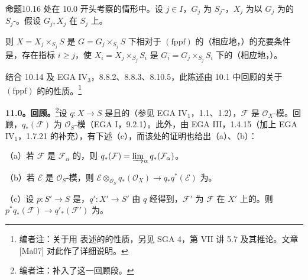 \begin{SGAresult}{命题}{10.16}
处在 10.0 开头考察的情形中。设 $j\in I$，$G_j$ 为 $S_j$-，$X_j$ 为以 $G_j$ 为的 $S_j$-。假设 $G_j,X_j$ 在 $S_j$ 上。

则 $X=X_j\times_{S_j}S$ 是 $G=G_j\times_{S_j}S$ 下相对于 $(\mathrm{fppf})$ 的（相应地，）的充要条件是，存在指标 $i\geq j$，使 $X_i=X_j\times_{S_j}S_i$ 是 $G_i=G_j\times_{S_j}S_i$ 下的（相应地，）。
\end{SGAresult}
结合 10.14 及 EGA IV$_3$，8.8.2、8.8.3、8.10.5，此陈述由 10.1 中回顾的关于 $(\mathrm{fppf})$ 的的性质。\footnote{编者注：关于用 表述的的性质，另见 SGA 4，第 VII 讲 5.7 及其推论。文章 [Ma07] 对此作了详细说明。}

\textbf{11.0。回顾。}\footnote{编者注：补入了这一回顾段。}设 $q:X\to S$ 是且的（参见 EGA IV$_1$，1.1、1.2），$\mathcal F$ 是 $\mathcal O_X$-模。回顾，$q_*(\mathcal F)$ 为 $\mathcal O_S$-模（EGA I，9.2.1）。此外，由 EGA III，1.4.15（加上 EGA IV$_1$，1.7.21 的补充），有下述（c），而该处的证明也给出（a）、（b）：

（a）若 $\mathcal F$ 是 $\mathcal F_\alpha$ 的，则 $q_*(\mathcal F)=\varinjlim_\alpha q_*(\mathcal F_\alpha)$。

（b）若 $\mathcal E$ 是 $\mathcal O_S$-模，则 $\mathcal E\otimes_{\mathcal O_S}q_*(\mathcal O_X)\to q_*q^*(\mathcal E)$ 为。

（c）设 $p:S'\to S$ 是，$q':X'\to S'$ 由 $q$ 经得到，$\mathcal F'$ 为 $\mathcal F$ 在 $X'$ 上的。则 $p^*q_*(\mathcal F)\to q'_*(\mathcal F')$ 为。

